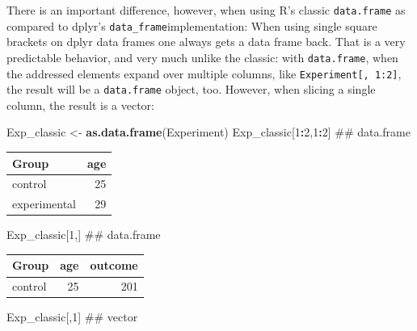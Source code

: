 \documentclass[]{svmono}
\newenvironment{Shaded}{\begin{snugshade}}{\end{snugshade}}
\newcommand{\KeywordTok}[1]{\textcolor[rgb]{0.13,0.29,0.53}{\textbf{#1}}}
\newcommand{\DecValTok}[1]{\textcolor[rgb]{0.00,0.00,0.81}{#1}}
\newcommand{\StringTok}[1]{\textcolor[rgb]{0.31,0.60,0.02}{#1}}
\newcommand{\OperatorTok}[1]{\textcolor[rgb]{0.81,0.36,0.00}{\textbf{#1}}}
\newcommand{\NormalTok}[1]{#1}
\theoremstyle{definition}
\theoremstyle{definition}
\theoremstyle{definition}
\theoremstyle{remark}
\begin{document}
There is an important difference, however, when using R's classic
\texttt{data.frame} as compared to dplyr's
\texttt{data\_frame}implementation: When using single square brackets on
dplyr data frames one always gets a data frame back. That is a very
predictable behavior, and very much unlike the classic: with
\texttt{data.frame}, when the addressed elements expand over multiple
columns, like \texttt{Experiment{[},\ 1:2{]}}, the result will be a
\texttt{data.frame} object, too. However, when slicing a single column,
the result is a vector:

\begin{Shaded}
\begin{Highlighting}[]
\NormalTok{Exp_classic <-}\StringTok{ }\KeywordTok{as.data.frame}\NormalTok{(Experiment)}
\NormalTok{Exp_classic[}\DecValTok{1}\OperatorTok{:}\DecValTok{2}\NormalTok{,}\DecValTok{1}\OperatorTok{:}\DecValTok{2}\NormalTok{]  ## data.frame}
\end{Highlighting}
\end{Shaded}

\begin{tabular}{l|r}
\hline
Group & age\\
\hline
control & 25\\
\hline
experimental & 29\\
\hline
\end{tabular}

\begin{Shaded}
\begin{Highlighting}[]
\NormalTok{Exp_classic[}\DecValTok{1}\NormalTok{,]       ## data.frame}
\end{Highlighting}
\end{Shaded}

\begin{tabular}{l|r|r}
\hline
Group & age & outcome\\
\hline
control & 25 & 201\\
\hline
\end{tabular}

\begin{Shaded}
\begin{Highlighting}[]
\NormalTok{Exp_classic[,}\DecValTok{1}\NormalTok{]       ## vector}
\end{Highlighting}
\end{Shaded}
\end{document}
